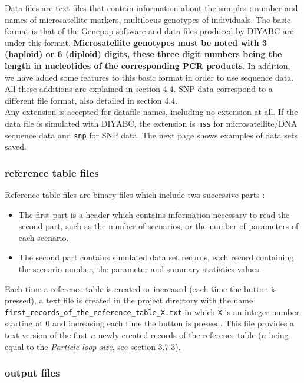 Data files are text files that contain information about the samples
: number and names of microsatellite markers, multilocus genotypes
of individuals. The basic format is that of the Genepop software \citep{RR1995}
and data files produced by DIYABC are under this format. \textbf{Microsatellite
genotypes must be noted with 3 (haploid) or 6 (diploid) digits, these
three digit numbers being the length in nucleotides of the corresponding
PCR products}. In addition, we have added some features to this basic
format in order to use sequence data. All these additions are explained
in section 4.4. SNP data correspond to a different file format, also
detailed in section 4.4.\\
 Any extension is accepted for datafile names, including no extension
at all. If the data file is simulated with DIYABC, the extension is
\texttt{mss} for microsatellite/DNA sequence data and \texttt{snp}
for SNP data. The next page shows examples of data sets saved.


\subsubsection{reference table files}

Reference table files are binary files which include two successive
parts :
\begin{itemize}
\item The first part is a header which contains information necessary to
read the second part, such as the number of scenarios, or the number
of parameters of each scenario.
\item The second part contains simulated data set records, each record containing
the scenario number, the parameter and summary statistics values.
\end{itemize}
Each time a reference table is created or increased (each time the
 button is pressed), a text file
is created in the project directory with the name \texttt{first\_records\_of\_the\_reference\_table\_X.txt}
in which \texttt{X} is an integer number starting at 0 and increasing
each time the  button is pressed.
This file provides a text version of the first $n$ newly created
records of the reference table ($n$ being equal to the \emph{Particle
loop size}, see section 3.7.3).\\



\subsubsection{output files}


